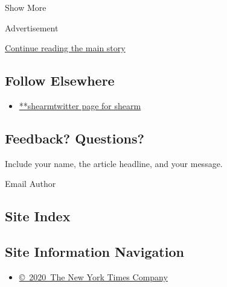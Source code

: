 Show More

Advertisement

\protect\hyperlink{after-mid2}{Continue reading the main story}

\hypertarget{follow-elsewhere}{%
\subsection{Follow Elsewhere}\label{follow-elsewhere}}

\begin{itemize}
\tightlist
\item
  \href{https://twitter.com/shearm}{**shearmtwitter page for shearm}
\end{itemize}

\hypertarget{feedback-questions}{%
\subsection{Feedback? Questions?}\label{feedback-questions}}

Include your name, the article headline, and your message.

Email Author

\hypertarget{site-index}{%
\subsection{Site Index}\label{site-index}}

\hypertarget{site-information-navigation}{%
\subsection{Site Information
Navigation}\label{site-information-navigation}}

\begin{itemize}
\tightlist
\item
  \href{https://help.nytimes3xbfgragh.onion/hc/en-us/articles/115014792127-Copyright-notice}{©~2020~The
  New York Times Company}
\end{itemize}

